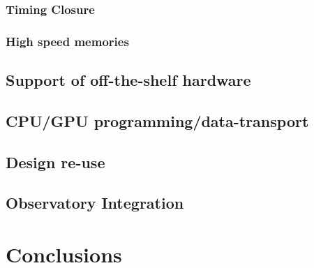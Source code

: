 \documentclass{ws-jai}
\begin{document}
\subsubsection{Timing Closure}

\subsubsection{High speed memories}


\subsection{Support of off-the-shelf hardware}

\subsection{CPU/GPU programming/data-transport}

\subsection{Design re-use}

\subsection{Observatory Integration}


\section{Conclusions} \label{sec:Conclusions}


 
\end{document}
